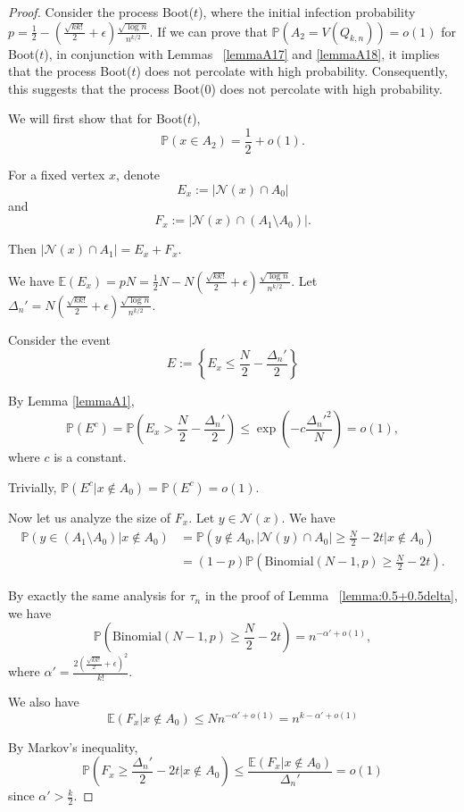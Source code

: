 \documentclass[reqno,11pt]{amsart}
\renewcommand{\leq}{\leqslant}
\renewcommand{\geq}{\geqslant}
\begin{document}
\begin{proof}
Consider the process Boot($t$), where the initial infection probability $p= \frac{1}{2}-\left(\frac{\sqrt{kk!}}{2}+\epsilon\right)\frac{\sqrt{\log n}}{n^{k/2}}$. If we can prove that $\mathbb{P}(A_2 = V(Q_{k,n})) = o(1)$ for Boot($t$), in conjunction with Lemmas ~\ref{lemmaA17} and \ref{lemmaA18}, it implies that the process Boot($t$) does not percolate with high probability. Consequently, this suggests that the process Boot($0$) does not percolate with high probability.

We will first show that for Boot($t$),
$$\mathbb{P}(x \in A_2)=\frac{1}{2}+o(1).$$

For a fixed vertex $x$, denote 
$$E_x:=|\mathcal{N}(x) \cap A_0|$$
and 
$$F_x:=|\mathcal{N}(x) \cap (A_1\setminus A_0)|.$$

Then $|\mathcal{N}(x) \cap A_1|=E_x+F_x$. 

We have $\mathbb{E}(E_x)=pN=\frac{1}{2}N-N\left(\frac{\sqrt{kk!}}{2}+\epsilon\right)\frac{\sqrt{\log n}}{n^{k/2}}.$ Let $\Delta_n'=N\left(\frac{\sqrt{kk!}}{2}+\epsilon\right)\frac{\sqrt{\log n}}{n^{k/2}}$. 

Consider the event 
$$E:=\left\{ E_x \leq \frac{N}{2}-\frac{\Delta_n'}{2}\right\}$$

By Lemma \ref{lemmaA1}, 
$$\mathbb{P}(E^c)= \mathbb{P}\left(E_x > \frac{N}{2}-\frac{\Delta_n'}{2}\right) \leq \exp\left(-c\frac{\Delta_n'^2}{N}\right)=o(1),$$ where $c$ is a constant.

Trivially, $\mathbb{P}(E^c | x \notin A_0)=\mathbb{P}(E^c)=o(1)$.

Now let us analyze the size of $F_x$. Let $y \in \mathcal{N}(x)$. We have 
\begin{align*}
\mathbb{P}\left(y \in (A_1 \setminus A_0)| x \notin A_0\right)&=\mathbb{P}(y \notin A_0,|\mathcal{N}(y) \cap A_0| \geq \frac{N}{2}-2t| x \notin A_0)\\
&=(1-p)\mathbb{P}(\text{Binomial}(N-1,p) \geq \frac{N}{2}-2t).
\end{align*}

By exactly the same analysis for $\tau_n$ in the proof of Lemma ~\ref{lemma:0.5+0.5delta}, we have 
$$\mathbb{P}(\text{Binomial}(N-1,p) \geq \frac{N}{2}-2t)=n^{-\alpha'+o(1)},$$ where $\alpha'=\frac{2(\frac{\sqrt{kk!}}{2}+\epsilon)^2}{k!}$. 

We also have 
$$\mathbb{E}(F_x| x \notin A_0) \leq N n^{-\alpha'+o(1)}=n^{k-\alpha'+o(1)}$$

By Markov's inequality, 
$$\mathbb{P}(F_x \geq \frac{\Delta_n'}{2}-2t | x \notin A_0) \leq \frac{\mathbb{E}(F_x | x \notin A_0)}{\Delta_n'}=o(1)$$
since $\alpha' > \frac{k}{2}$. 


\end{proof}
\end{document}
